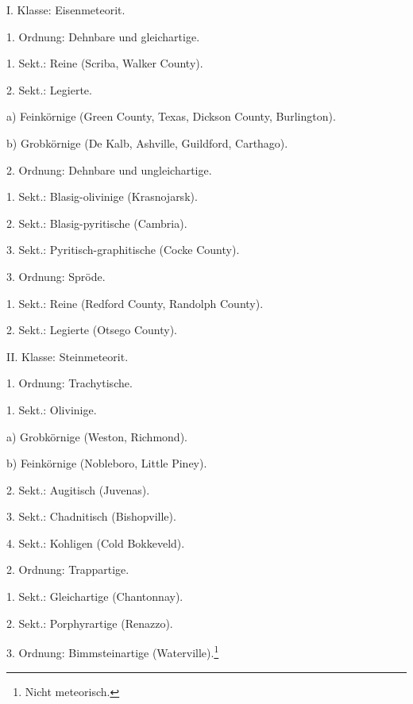 \documentclass[a4paper, 11pt, oneside]{article}
\begin{document}
I. Klasse: Eisenmeteorit.

1. Ordnung: Dehnbare und gleichartige.

1. Sekt.: Reine (Scriba, Walker County).

2. Sekt.: Legierte.

a) Feinkörnige (Green County, Texas, Dickson County, Burlington).

b) Grobkörnige (De Kalb, Ashville, Guildford, Carthago).

2. Ordnung: Dehnbare und ungleichartige.

1. Sekt.: Blasig-olivinige (Krasnojarsk).

2. Sekt.: Blasig-pyritische (Cambria).

3. Sekt.: Pyritisch-graphitische (Cocke County).

3. Ordnung: Spröde.

1. Sekt.: Reine (Redford County, Randolph County).

2. Sekt.: Legierte (Otsego County).

II. Klasse: Steinmeteorit.

1. Ordnung: Trachytische.

1. Sekt.: Olivinige.

a) Grobkörnige (Weston, Richmond).

b) Feinkörnige (Nobleboro, Little Piney).

2. Sekt.: Augitisch (Juvenas).

3. Sekt.: Chadnitisch (Bishopville).

4. Sekt.: Kohligen (Cold Bokkeveld).

2. Ordnung: Trappartige.

1. Sekt.: Gleichartige (Chantonnay).

2. Sekt.: Porphyrartige (Renazzo).

3. Ordnung: Bimmsteinartige (Waterville).\footnote{Nicht meteorisch.}
\end{document}

